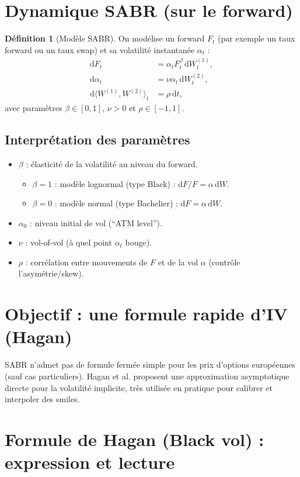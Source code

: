 \documentclass[11pt,a4paper]{report}
\newcommand{\dd}{\mathrm{d}}
\newcommand{\1}{\mathbbm{1}}
\theoremstyle{definition}
\newtheorem{definition}{Définition}[chapter]
\theoremstyle{plain}
\theoremstyle{remark}
\begin{document}
\section{Dynamique SABR (sur le forward)}
\begin{definition}[Modèle SABR]
On modélise un forward $F_t$ (par exemple un taux forward ou un taux swap) et sa volatilité instantanée $\alpha_t$ :
\begin{align*}
\dd F_t &= \alpha_t F_t^\beta\,\dd W_t^{(1)},\\
\dd \alpha_t &= \nu \alpha_t\,\dd W_t^{(2)},\\
\dd\langle W^{(1)},W^{(2)}\rangle_t &= \rho\,\dd t,
\end{align*}
avec paramètres $\beta\in[0,1]$, $\nu>0$ et $\rho\in[-1,1]$.
\end{definition}

\subsection{Interprétation des paramètres}
\begin{itemize}
  \item $\beta$ : élasticité de la volatilité au niveau du forward.
  \begin{itemize}
    \item $\beta=1$ : modèle lognormal (type Black) : $\dd F/F = \alpha\,\dd W$.
    \item $\beta=0$ : modèle normal (type Bachelier) : $\dd F = \alpha\,\dd W$.
  \end{itemize}
  \item $\alpha_0$ : niveau initial de vol (``ATM level'').
  \item $\nu$ : vol-of-vol (à quel point $\alpha_t$ bouge).
  \item $\rho$ : corrélation entre mouvements de $F$ et de la vol $\alpha$ (contrôle l'asymétrie/skew).
\end{itemize}

\section{Objectif : une formule rapide d'IV (Hagan)}
SABR n'admet pas de formule fermée simple pour les prix d'options européennes (sauf cas particuliers).
Hagan et al. proposent une approximation asymptotique directe pour la volatilité implicite,
très utilisée en pratique pour calibrer et interpoler des smiles.

\section{Formule de Hagan (Black vol) : expression et lecture}
\label{sec:hagan_formula}
\end{document}
